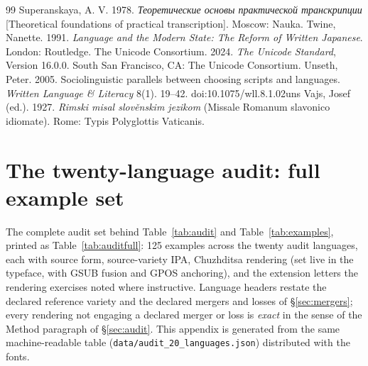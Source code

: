 \documentclass[11pt]{article}
\begin{document}
\begin{thebibliography}{99}
 Superanskaya, A. V. 1978. \emph{Теоретические основы практической транскрипции} [Theoretical foundations of practical transcription]. Moscow: Nauka.
 Twine, Nanette. 1991. \emph{Language and the Modern State: The Reform of Written Japanese}. London: Routledge.
 The Unicode Consortium. 2024. \emph{The Unicode Standard}, Version 16.0.0. South San Francisco, CA: The Unicode Consortium.
 Unseth, Peter. 2005. Sociolinguistic parallels between choosing scripts and languages. \emph{Written Language \& Literacy} 8(1). 19--42. doi:10.1075/wll.8.1.02uns
 Vajs, Josef (ed.). 1927. \emph{Rimski misal slov\v{e}nskim jezikom} (Missale Romanum slavonico idiomate). Rome: Typis Polyglottis Vaticanis.
\end{thebibliography}

\appendix
\renewcommand{\thetable}{A\arabic{table}}\setcounter{table}{0}
\section{The twenty-language audit: full example set}\label{app:audit}

\noindent The complete audit set behind Table~\ref{tab:audit} and Table~\ref{tab:examples}, printed as Table~\ref{tab:auditfull}: 125 examples across the twenty audit languages, each with source form, source-variety IPA, Chuzhditsa rendering (set live in the typeface, with GSUB fusion and GPOS anchoring), and the extension letters the rendering exercises noted where instructive. Language headers restate the declared reference variety and the declared mergers and losses of \S\ref{sec:mergers}; every rendering not engaging a declared merger or loss is \emph{exact} in the sense of the Method paragraph of \S\ref{sec:audit}. This appendix is generated from the same machine-readable table (\texttt{data/audit\_20\_languages.json}) distributed with the fonts.


\end{document}
